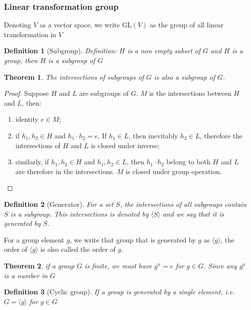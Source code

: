 \documentclass{amsart}
\newtheorem{definition}{Definition}
\newtheorem{theorem}{Theorem}
\begin{document}
\subsubsection*{Linear transformation group}
Denoting $V$ as a vector space, we write $\text{GL}(V)$ as the group of all linear transformation in $V$

\vspace{10pt}

\begin{definition}[Subgroup]
    Definition: $H$ is a non empty subset of $G$ and $H$ is a group, then $H$ is a subgroup of $G$
\end{definition}

\begin{theorem}
    The intersections of subgroups of $G$ is also a subgroup of $G$.
\end{theorem}
\begin{proof}
    Suppose $H$ and $L$ are subgroups of $G$. $M$ is the intersections between $H$ and $L$, then:
    \begin{enumerate}
        \item identity $e \in M$;
        \item if $h_1, h_2 \in H$ and $h_1 \cdot h_2 = e$, If $h_1\in L$, then inevitably $h_2 \in L$, therefore the intersections of $H$ and $L$ is closed under inverse;
        \item similarly, if $h_1, h_2 \in H$ and $h_1, h_2 \in L$, then $h_1\cdot h_2$ belong to both $H$ and $L$ are therefore in the intersections. $M$ is closed under group operation.
    \end{enumerate}
\end{proof}

\begin{definition}[Generator]
    For a set $S$, the intersections of all subgroups contain $S$ is a subgroup. This intersections is denoted by $\langle S\rangle$ and we say that it is generated by $S$. 
\end{definition}
For a group element $g$, we write that group that is generated by $g$ as $\langle g \rangle$, the order of $\langle g \rangle$ is also called the order of $g$. 

\begin{theorem}
    if a group $G$ is finite, we must have $g^n = e$ for $g \in G$. Since any $g^a$ is a number in $G$
\end{theorem}

\begin{definition}[Cyclic group]
    If a group is generated by a single element, i.e. $G = \langle g \rangle$ for $g \in G$
\end{definition}
\end{document}
